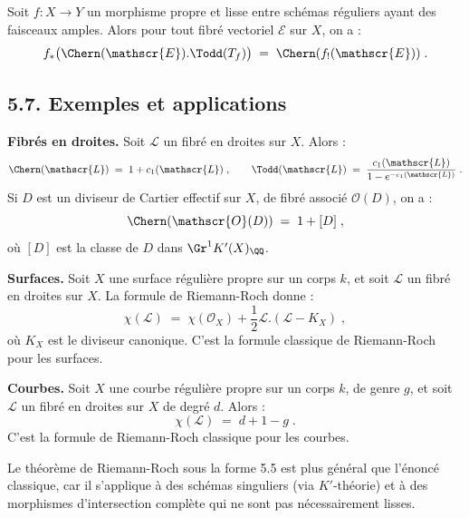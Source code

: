 \begin{corollaire}[5.6]%
Soit $f : X \to Y$ un morphisme propre et lisse entre schémas réguliers ayant des faisceaux amples. Alors pour tout fibré vectoriel $\mathscr{E}$ sur $X$, on a :
\[
f_*\bigl(\Chern(\mathscr{E}) . \Todd(T_f)\bigr) \; = \; \Chern(f_!(\mathscr{E}))\; .
\]
\end{corollaire}


\subsection*{5.7. Exemples et applications}

\begin{exemple}[5.7.1]%
\textbf{Fibrés en droites.} Soit $\mathscr{L}$ un fibré en droites sur $X$. Alors :
\[
\Chern(\mathscr{L}) \; = \; 1 + c_1(\mathscr{L})\; , \qquad \Todd(\mathscr{L}) \; = \; \frac{c_1(\mathscr{L})}{1 - e^{-c_1(\mathscr{L})}}\; .
\]
Si $D$ est un diviseur de Cartier effectif sur $X$, de fibré associé $\mathscr{O}(D)$, on a :
\[
\Chern(\mathscr{O}(D)) \; = \; 1 + [D]\; ,
\]
où $[D]$ est la classe de $D$ dans $\Gr^1 K'(X)_{\QQ}$.
\end{exemple}

\begin{exemple}[5.7.2]%
\textbf{Surfaces.} Soit $X$ une surface régulière propre sur un corps $k$, et soit $\mathscr{L}$ un fibré en droites sur $X$. La formule de Riemann-Roch donne :
\[
\chi(\mathscr{L}) \; = \; \chi(\mathscr{O}_X) + \frac{1}{2}\mathscr{L}.(\mathscr{L} - K_X)\; ,
\]
où $K_X$ est le diviseur canonique. C'est la formule classique de Riemann-Roch pour les surfaces.
\end{exemple}

\begin{exemple}[5.7.3]%
\textbf{Courbes.} Soit $X$ une courbe régulière propre sur un corps $k$, de genre $g$, et soit $\mathscr{L}$ un fibré en droites sur $X$ de degré $d$. Alors :
\[
\chi(\mathscr{L}) \; = \; d + 1 - g\; .
\]
C'est la formule de Riemann-Roch classique pour les courbes.
\end{exemple}

\begin{remarque}[5.8]%
Le théorème de Riemann-Roch sous la forme 5.5 est plus général que l'énoncé classique, car il s'applique à des schémas singuliers (via $K'$-théorie) et à des morphismes d'intersection complète qui ne sont pas nécessairement lisses.
\end{remarque}


